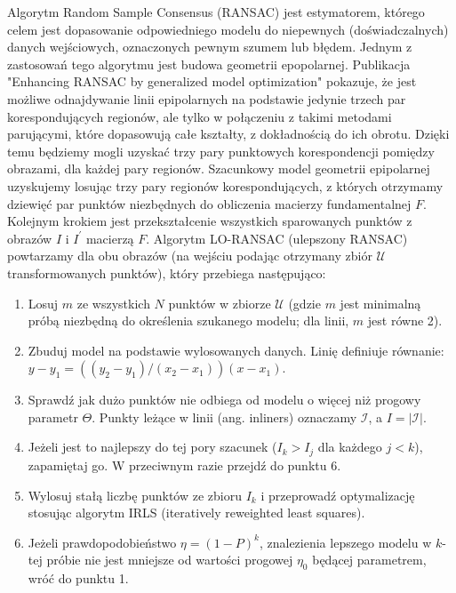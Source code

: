 Algorytm Random Sample Consensus (RANSAC) \cite{ransac} jest estymatorem,
którego celem jest dopasowanie odpowiedniego modelu do niepewnych
(doświadczalnych) danych wejściowych, oznaczonych pewnym szumem lub błędem.
Jednym z zastosowań tego algorytmu jest budowa geometrii epopolarnej.
Publikacja "Enhancing RANSAC by generalized model optimization"
\cite{loransac} pokazuje, że jest możliwe odnajdywanie linii
epipolarnych na podstawie jedynie trzech par korespondujących regionów, ale
tylko w połączeniu z takimi metodami parującymi, które dopasowują całe
kształty, z dokładnością do ich obrotu. Dzięki temu będziemy mogli uzyskać trzy
pary punktowych korespondencji pomiędzy obrazami, dla każdej pary regionów.
Szacunkowy model geometrii epipolarnej uzyskujemy losując trzy pary regionów
korespondujących, z których otrzymamy dziewięć par punktów niezbędnych do
obliczenia macierzy fundamentalnej $F$. Kolejnym krokiem jest przekształcenie
wszystkich sparowanych punktów z obrazów $I$ i $I^\prime$ macierzą $F$.
Algorytm LO-RANSAC \cite{loransac} (ulepszony RANSAC) powtarzamy dla obu
obrazów (na wejściu podając otrzymany zbiór $\mathcal{U}$ transformowanych
punktów), który przebiega następująco: \begin{enumerate} \item Losuj $m$ ze
    wszystkich $N$ punktów w zbiorze $\mathcal{U}$ (gdzie $m$ jest minimalną
    próbą niezbędną do określenia szukanego modelu; dla linii, $m$ jest równe
    2). \item Zbuduj model na podstawie wylosowanych danych. Linię definiuje
    równanie: $y - y_1 = (( y_2 - y_1 ) / ( x_2 - x_1 )) (x - x_1)$.  \item
    Sprawdź jak dużo punktów nie odbiega od modelu o więcej niż progowy
    parametr $\Theta$. Punkty leżące w linii (ang. inliners) oznaczamy
    $\mathcal{I}$, a $I = |\mathcal{I}|$.  \item Jeżeli jest to najlepszy do
    tej pory szacunek ($I_k > I_j$ dla każdego $j < k$), zapamiętaj go. W
    przeciwnym razie przejdź do punktu 6. \item Wylosuj stałą liczbę punktów ze
    zbioru $I_k$ i przeprowadź optymalizację stosując algorytm IRLS
    (iteratively reweighted least squares). \item Jeżeli prawdopodobieństwo
    $\eta = (1-P)^k$, znalezienia lepszego modelu w $k$-tej próbie nie jest
    mniejsze od wartości progowej $\eta_0$ będącej parametrem, wróć do punktu
    1.  \end{enumerate}

